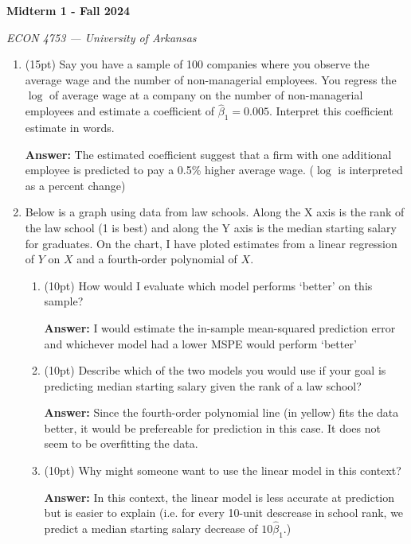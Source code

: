 \documentclass[12pt]{article}
\newcommand{\answer}[1]{{\color{blue_winged_teal}\textbf{Answer:} #1}}
\newcommand{\pts}[1]{{\color{zinc500}#1}}
\begin{document}
\begin{center}
  {\Huge\bf Midterm 1 - Fall 2024}
  
  \smallskip
  {\large\it  ECON 4753 — University of Arkansas}
\end{center}

\vspace{5mm}
\begin{enumerate}
  \item \pts{(15pt)} Say you have a sample of 100 companies where you observe the average wage and the number of non-managerial employees. You regress the $\log$ of average wage at a company on the number of non-managerial employees and estimate a coefficient of $\hat{\beta}_1 = 0.005$. Interpret this coefficient estimate in words.
  
  \answer{The estimated coefficient suggest that a firm with one additional employee is predicted to pay a 0.5\% higher average wage. ($\log$ is interpreted as a percent change)}



  \vspace{5mm}
  \item Below is a graph using data from law schools. Along the X axis is the rank of the law school (1 is best) and along the Y axis is the median starting salary for graduates. On the chart, I have ploted estimates from a linear regression of $Y$ on $X$ and a fourth-order polynomial of $X$.
  \begin{enumerate}
    \item \pts{(10pt)} How would I evaluate which model performs `better' on this sample?
    
    \answer{I would estimate the in-sample mean-squared prediction error and whichever model had a lower MSPE would perform `better'}

    \item \pts{(10pt)} Describe which of the two models you would use if your goal is predicting median starting salary given the rank of a law school? 
    
    \answer{Since the fourth-order polynomial line (in yellow) fits the data better, it would be prefereable for prediction in this case. It does not seem to be overfitting the data.}

    \item \pts{(10pt)} Why might someone want to use the linear model in this context?
    
    \answer{In this context, the linear model is less accurate at prediction but is easier to explain (i.e. for every 10-unit descrease in school rank, we predict a median starting salary decrease of $10 \hat{\beta}_1$.)}
  \end{enumerate}


\end{enumerate}
\end{document}
